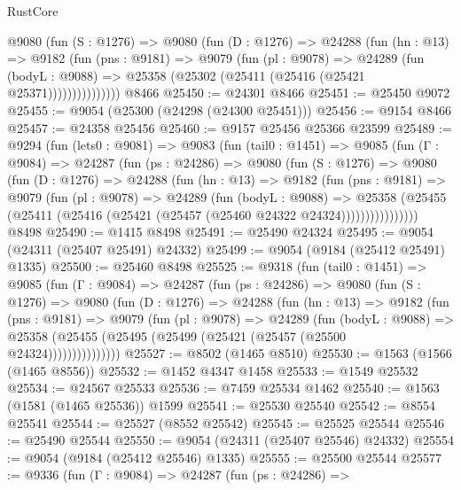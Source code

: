 \begin{lexlean}{RustCore}
\begin{coremodule}
            @9080
              (fun (S : @1276) =>
              @9080
                (fun (D : @1276) =>
                @24288
                  (fun (hn : @13) =>
                  @9182
                    (fun (pns : @9181) =>
                    @9079
                      (fun (pl : @9078) =>
                      @24289
                        (fun (bodyL : @9088) =>
                        @25358 (@25302 (@25411 (@25416 (@25421 @25371)))))))))))))))
    @8466
@25450 := @24301 @8466
@25451 := @25450 @9072
@25455 := @9054 (@25300 (@24298 (@24300 @25451)))
@25456 := @9154 @8466
@25457 := @24358 @25456
@25460 := @9157 @25456 @25366 @23599
@25489 := @9294
    (fun (lets0 : @9081) =>
    @9083
      (fun (tail0 : @1451) =>
      @9085
        (fun (Γ : @9084) =>
        @24287
          (fun (ps : @24286) =>
          @9080
            (fun (S : @1276) =>
            @9080
              (fun (D : @1276) =>
              @24288
                (fun (hn : @13) =>
                @9182
                  (fun (pns : @9181) =>
                  @9079
                    (fun (pl : @9078) =>
                    @24289
                      (fun (bodyL : @9088) =>
                      @25358
                        (@25455
                          (@25411 (@25416 (@25421 (@25457 (@25460 @24322 @24324))))))))))))))))
    @8498
@25490 := @1415 @8498
@25491 := @25490 @24324
@25495 := @9054 (@24311 (@25407 @25491) @24332)
@25499 := @9054 (@9184 (@25412 @25491) @1335)
@25500 := @25460 @8498
@25525 := @9318
    (fun (tail0 : @1451) =>
    @9085
      (fun (Γ : @9084) =>
      @24287
        (fun (ps : @24286) =>
        @9080
          (fun (S : @1276) =>
          @9080
            (fun (D : @1276) =>
            @24288
              (fun (hn : @13) =>
              @9182
                (fun (pns : @9181) =>
                @9079
                  (fun (pl : @9078) =>
                  @24289
                    (fun (bodyL : @9088) =>
                    @25358 (@25455 (@25495 (@25499 (@25421 (@25457 (@25500 @24324)))))))))))))))
@25527 := @8502 (@1465 @8510)
@25530 := @1563 (@1566 (@1465 @8556))
@25532 := @1452 @4347 @1458
@25533 := @1549 @25532
@25534 := @24567 @25533
@25536 := @7459 @25534 @1462
@25540 := @1563 (@1581 (@1465 @25536)) @1599
@25541 := @25530 @25540
@25542 := @8554 @25541
@25544 := @25527 (@8552 @25542)
@25545 := @25525 @25544
@25546 := @25490 @25544
@25550 := @9054 (@24311 (@25407 @25546) @24332)
@25554 := @9054 (@9184 (@25412 @25546) @1335)
@25555 := @25500 @25544
@25577 := @9336
    (fun (Γ : @9084) =>
    @24287
      (fun (ps : @24286) =>

\end{coremodule}
\end{lexlean}
